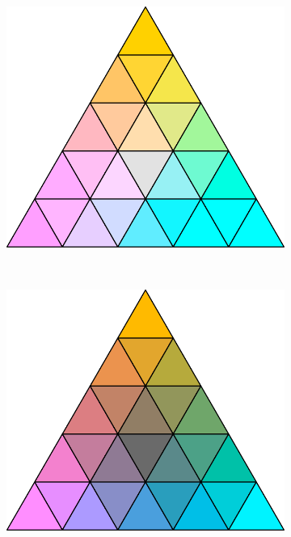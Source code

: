 \documentclass[parskip=half]{scrartcl}
\begin{document}
\begin{appendix}
\begin{figure}[!htb]
\centering
  \begin{subfigure}[t]{0.3\textwidth}
  \centering
  \includegraphics[width = \textwidth]{./fig/contrast0.pdf}
  \label{fig:contrast0}
  \end{subfigure}%
  ~
  \begin{subfigure}[t]{0.3\textwidth}
  \includegraphics[width = \textwidth]{./fig/contrast0-5.pdf}

\end{subfigure}
\end{figure}
\end{appendix}
\end{document}
